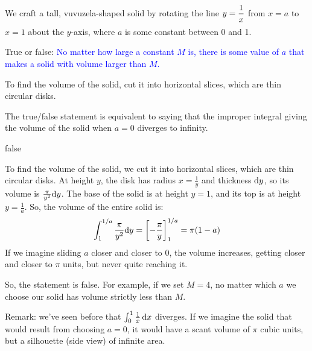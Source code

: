 \begin{Mquestion}
We craft a tall, vuvuzela-shaped solid by rotating the line $y = \dfrac{1}{x\vphantom{\frac{1}{2}}}$ from $x=a$ to $x=1$ about the $y$-axis, where $a$ is some constant between 0 and 1.

\begin{center}
\end{center}
True or false: \textcolor{blue}{No matter how large a constant $M$ is, there is some value of $a$ that makes a solid with volume larger than $M$.}
\end{Mquestion}
\begin{hint}
To find the volume of the solid, cut it into horizontal slices, which are thin circular disks.

The true/false statement is equivalent to saying that the improper integral giving the volume of the solid when $a=0$ diverges to infinity.
\end{hint}
\begin{answer}
false
\end{answer}
\begin{solution}
To find the volume of the solid, we cut it into horizontal slices, which are thin circular disks. At height $y$, the disk has radius $x=\frac{1}{y}$ and thickness $\mathrm{d}y$, so its volume is $\frac{\pi}{y^2}\mathrm{d}y$. The base of the solid is at height $y=1$, and its top is at height $y=\frac{1}{a}$. So, the volume of the entire solid is:
\begin{align*}
\int_1^{1/a} \frac{\pi}{y^2}\mathrm{d}y = \left[-\frac{\pi}{y}\right]_1^{1/a} = \pi (1-a)
\end{align*}
If we imagine sliding $a$ closer and closer to 0, the volume increases, getting closer and closer to $\pi$ units, but never quite reaching it.

So, the statement is false. For example, if we set $M=4$, no matter which $a$ we choose our solid has volume strictly less than $M$.

Remark: we've seen before that $\int_0^1 \frac{1}{x}\,\mathrm{d}x$ diverges. If we imagine the solid that would result from choosing $a=0$, it would have a scant volume of $\pi$ cubic units, but a silhouette (side view) of infinite area.
\end{solution}


